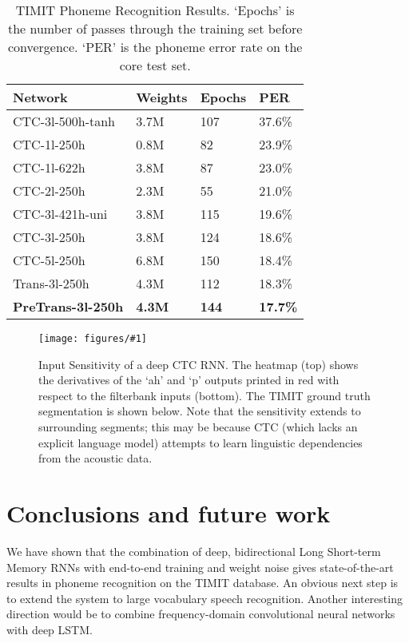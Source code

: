 \documentclass{article}
\newcommand{\flabel}[1]{\label{fig:#1}}
\newcommand{\tlabel}[1]{\label{tab:#1}}
\newcommand{\capt}[2]{\caption[#1]{#1#2}}
\newcommand{\figt}[5]
{
\begin{figure}[t]
\begin{center}
\texttt{[image: figures/\#1]}
\end{center}
\capt{#4}{#5}
\flabel{#2}
\end{figure}
}
\begin{document}
\begin{table}
\centering
\capt{TIMIT Phoneme Recognition Results.}{ `Epochs' is the number of passes through the training set before convergence. `PER' is the phoneme error rate on the core test set.}
\tlabel{timit}
\vskip 0.15in
\begin{center}
\begin{small}
\begin{sc}\begin{tabular}{llll}
\hline
Network & Weights & Epochs & PER\\
\hline
CTC-3l-500h-tanh & 3.7M & 107 & 37.6\%\\
CTC-1l-250h & 0.8M & 82 & 23.9\%\\
CTC-1l-622h & 3.8M & 87 & 23.0\%\\
CTC-2l-250h & 2.3M & 55 & 21.0\%\\
CTC-3l-421h-uni & 3.8M & 115 & 19.6\%\\
CTC-3l-250h & 3.8M & 124 & 18.6\%\\
CTC-5l-250h & 6.8M & 150 & 18.4\%\\
Trans-3l-250h & 4.3M & 112 & 18.3\%\\
\textbf{PreTrans-3l-250h} & \textbf{4.3M} & \textbf{144} & \textbf{17.7\%}\\
\hline
\end{tabular}
\end{sc}
\end{small}
\end{center}
\vskip -0.1in
\end{table}








\figt{spectrogram_sensitivity_dbl_ah_p}{sensitivity}{1}{Input Sensitivity of a deep CTC RNN.}{ The heatmap (top) shows the derivatives of the `ah' and `p' outputs printed in red with respect to the filterbank inputs (bottom). The TIMIT ground truth segmentation is shown below. 
Note that the sensitivity extends to surrounding segments; this may be because CTC (which lacks an explicit language model) attempts to learn linguistic dependencies from the acoustic data.}



\section{Conclusions and future work}
\label{sec:conclusion}

We have shown that the combination of deep, bidirectional Long Short-term Memory RNNs with end-to-end training and weight noise gives state-of-the-art results in phoneme recognition on the TIMIT database.
An obvious next step is to extend the system to large vocabulary speech recognition.
Another interesting direction would be to combine frequency-domain convolutional neural networks~\cite{mohamed12cnn} with deep LSTM.

\clearpage
\begin{spacing}{0.97}


\end{spacing}
\end{document}
